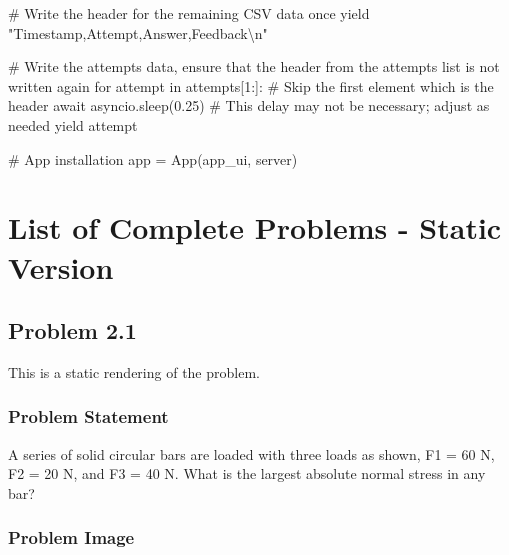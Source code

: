 \documentclass[
  letterpaper,
  DIV=11,
  numbers=noendperiod]{scrreprt}
\newenvironment{Shaded}{\begin{snugshade}}{\end{snugshade}}
\newcommand{\NormalTok}[1]{\textcolor[rgb]{0.00,0.23,0.31}{#1}}
\begin{document}
\begin{Shaded}
\begin{Highlighting}[]
\NormalTok{        \# Write the header for the remaining CSV data once}
\NormalTok{        yield "Timestamp,Attempt,Answer,Feedback\textbackslash{}n"}
        
\NormalTok{        \# Write the attempts data, ensure that the header from the attempts list is not written again}
\NormalTok{        for attempt in attempts[1:]:  \# Skip the first element which is the header}
\NormalTok{            await asyncio.sleep(0.25)  \# This delay may not be necessary; adjust as needed}
\NormalTok{            yield attempt}


\NormalTok{\# App installation}
\NormalTok{app = App(app\_ui, server)}
\end{Highlighting}
\end{Shaded}

\part{List of Complete Problems - Static Version}

\chapter*{Problem 2.1}\label{problem-2.1-1}


This is a static rendering of the problem.

\section*{Problem Statement}\label{problem-statement}


A series of solid circular bars are loaded with three loads as shown, F1
= 60 N, F2 = 20 N, and F3 = 40 N. What is the largest absolute normal
stress in any bar?

\section*{Problem Image}\label{problem-image-10}

\end{document}
